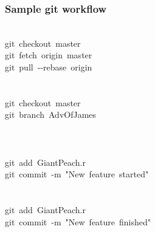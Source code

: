 \documentclass{beamer}\usepackage[]{graphicx}\usepackage[]{color}
\makeatletter
\newcommand{\hlstr}[1]{\textcolor[rgb]{0.192,0.494,0.8}{#1}}%
\newcommand{\hlopt}[1]{\textcolor[rgb]{0,0,0}{#1}}%
\newcommand{\hlstd}[1]{\textcolor[rgb]{0.345,0.345,0.345}{#1}}%
\newenvironment{kframe}{%
 \def\at@end@of@kframe{}%
 \ifinner\ifhmode%
  \def\at@end@of@kframe{\end{minipage}}%
  \begin{minipage}{\columnwidth}%
 \fi\fi%
 \def\FrameCommand##1{\hskip\@totalleftmargin \hskip-\fboxsep
 \colorbox{shadecolor}{##1}\hskip-\fboxsep
     \hskip-\linewidth \hskip-\@totalleftmargin \hskip\columnwidth}%
 \MakeFramed {\advance\hsize-\width
   \@totalleftmargin\z@ \linewidth\hsize
   \@setminipage}}%
 {\par\unskip\endMakeFramed%
 \at@end@of@kframe}
\newenvironment{knitrout}{}{} %
\makeatother
\begin{document}
\begin{frame}[fragile]
\frametitle{Sample git workflow}
\begin{knitrout}\tiny
{}\color{fgcolor}\begin{kframe}
\noindent
\ttfamily
\hlstd{}\hspace*{\fill}\\
\hlstd{git\ checkout\ master\hspace*{\fill}\\
git\ fetch\ origin\ master\hspace*{\fill}\\
git\ pull\ }\hlopt{{-}{-}}\hlstd{rebase\ origin}\hspace*{\fill}\\
\hspace*{\fill}\\
\hspace*{\fill}\\
\hlstd{git\ checkout\ master\hspace*{\fill}\\
git\ branch\ AdvOfJames}\hspace*{\fill}\\
\hspace*{\fill}\\
\hlstd{}\hspace*{\fill}\\
\hspace*{\fill}\\
\hlstd{git\ add\ GiantPeach.r\hspace*{\fill}\\
git\ commit\ }\hlopt{{-}}\hlstd{m\ }\hlstr{"New\ feature\ started"}\hlstd{}\hspace*{\fill}\\
\hspace*{\fill}\\
\hspace*{\fill}\\
\hlstd{git\ add\ GiantPeach.r\hspace*{\fill}\\
git\ commit\ }\hlopt{{-}}\hlstd{m\ }\hlstr{"New\ feature\ finished"}\hlstd{}\hspace*{\fill}\\
\hspace*{\fill}\\

\end{kframe}
\end{knitrout}
\end{frame}
\end{document}
